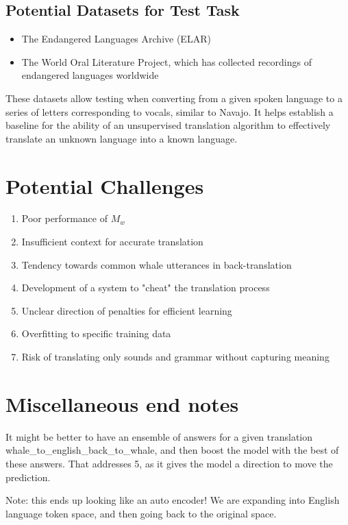 \documentclass{article}
\begin{document}
\subsection{Potential Datasets for Test Task}
\begin{itemize}
    \item The Endangered Languages Archive (ELAR)
    \item The World Oral Literature Project, which has collected recordings of endangered languages worldwide
\end{itemize}

These datasets allow testing when converting from a given spoken language to a series of letters corresponding to vocals, similar to Navajo. It helps establish a baseline for the ability of an unsupervised translation algorithm to effectively translate an unknown language into a known language.
\section{Potential Challenges}
\begin{enumerate}
    \item Poor performance of $M_w$
    \item Insufficient context for accurate translation
    \item Tendency towards common whale utterances in back-translation
    \item Development of a system to "cheat" the translation process
    \item Unclear direction of penalties for efficient learning
    \item Overfitting to specific training data
    \item Risk of translating only sounds and grammar without capturing meaning
\end{enumerate}
\section{Miscellaneous end notes}

It might be better to have an ensemble of answers for a given translation whale\_to\_english\_back\_to\_whale, and then boost the model with the best of these answers. That addresses 5, as it gives the model a direction to move the prediction.

Note: this ends up looking like an auto encoder! We are expanding into English language token space, and then going back to the original space.
\end{document}
